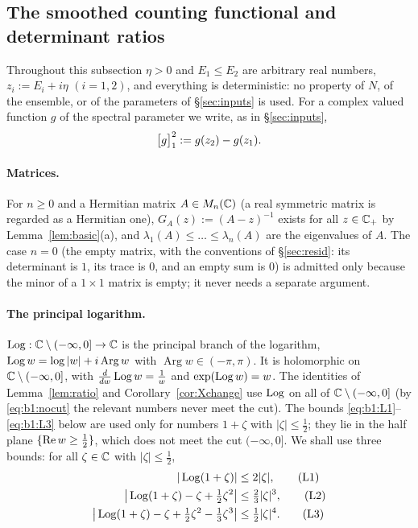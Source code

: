 \subsection{The smoothed counting functional and determinant ratios}\label{sec:X}

Throughout this subsection $\eta>0$ and $E_1\le E_2$ are arbitrary real numbers, $z_i:=E_i+i\eta$ $(i=1,2)$, and everything is
deterministic: no property of $N$, of the ensemble, or of the parameters of \S\ref{sec:inputs} is used. For a complex valued function
$g$ of the spectral parameter we write, as in \S\ref{sec:inputs},
\[
\big[g\big]_{1}^{2}:=g(z_2)-g(z_1).
\]

\paragraph{Matrices.} For $n\ge0$ and a Hermitian matrix $A\in M_n(\mathbb{C})$ (a real symmetric matrix is regarded as a Hermitian one),
$G_A(z):=(A-z)^{-1}$ exists for all $z\in\mathbb{C}_+$ by Lemma~\ref{lem:basic}(a), and $\lambda_1(A)\le\dots\le\lambda_n(A)$ are the
eigenvalues of $A$. The case $n=0$ (the empty matrix, with the conventions of \S\ref{sec:resid}: its determinant is $1$, its trace is $0$, and an empty
sum is $0$) is admitted only because the minor of a $1\times1$ matrix is empty; it never needs a separate argument.

\paragraph{The principal logarithm.} $\operatorname{Log}:\mathbb{C}\setminus(-\infty,0]\to\mathbb{C}$ is the principal branch of the logarithm,
$\operatorname{Log} w=\log|w|+i\operatorname{Arg}w$ with $\operatorname{Arg}w\in(-\pi,\pi)$. It is holomorphic on $\mathbb{C}\setminus(-\infty,0]$, with
$\frac{d}{dw}\operatorname{Log} w=\frac1w$ and $\exp(\operatorname{Log} w)=w$. The identities of Lemma~\ref{lem:ratio} and Corollary~\ref{cor:Xchange} use $\operatorname{Log}$ on all of $\mathbb{C}\setminus(-\infty,0]$
(by \eqref{eq:b1:nocut} the relevant numbers never meet the cut). The bounds \eqref{eq:b1:L1}--\eqref{eq:b1:L3} below are used only for numbers $1+\zeta$ with $|\zeta|\le\frac12$;
they lie in the half plane $\{\operatorname{Re} w\ge\frac12\}$, which does not meet the cut $(-\infty,0]$. We shall use three bounds: for all
$\zeta\in\mathbb{C}$ with $|\zeta|\le\frac12$,
\begin{align}
|\operatorname{Log}(1+\zeta)|&\le2|\zeta|,\tag{L1}\label{eq:b1:L1}\\
\big|\operatorname{Log}(1+\zeta)-\zeta+\tfrac12\zeta^2\big|&\le\tfrac23|\zeta|^3,\tag{L2}\label{eq:b1:L2}\\
\big|\operatorname{Log}(1+\zeta)-\zeta+\tfrac12\zeta^2-\tfrac13\zeta^3\big|&\le\tfrac12|\zeta|^4.\tag{L3}\label{eq:b1:L3}
\end{align}

